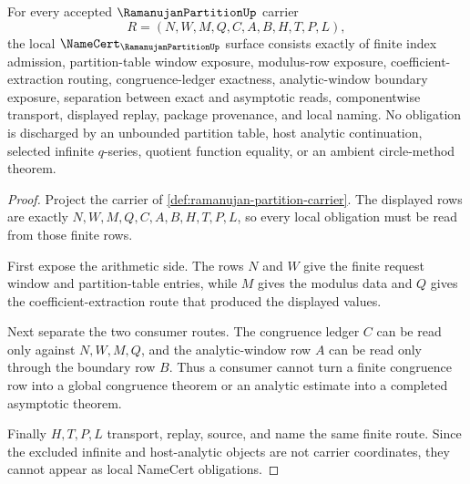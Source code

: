 \begin{theorem}
\label{thm:ramanujan-partition-namecert-obligations}
For every accepted $\RamanujanPartitionUp$ carrier
$$
R=(N,W,M,Q,C,A,B,H,T,P,L),
$$
the local $\NameCert_{\RamanujanPartitionUp}$ surface consists exactly of finite index admission, partition-table window exposure, modulus-row exposure, coefficient-extraction routing, congruence-ledger exactness, analytic-window boundary exposure, separation between exact and asymptotic reads, componentwise transport, displayed replay, package provenance, and local naming. No obligation is discharged by an unbounded partition table, host analytic continuation, selected infinite $q$-series, quotient function equality, or an ambient circle-method theorem.
\end{theorem}
\begin{proof}
Project the carrier of \autoref{def:ramanujan-partition-carrier}. The displayed rows are exactly $N,W,M,Q,C,A,B,H,T,P,L$, so every local obligation must be read from those finite rows.

First expose the arithmetic side. The rows $N$ and $W$ give the finite request window and partition-table entries, while $M$ gives the modulus data and $Q$ gives the coefficient-extraction route that produced the displayed values.

Next separate the two consumer routes. The congruence ledger $C$ can be read only against $N,W,M,Q$, and the analytic-window row $A$ can be read only through the boundary row $B$. Thus a consumer cannot turn a finite congruence row into a global congruence theorem or an analytic estimate into a completed asymptotic theorem.

Finally $H,T,P,L$ transport, replay, source, and name the same finite route. Since the excluded infinite and host-analytic objects are not carrier coordinates, they cannot appear as local NameCert obligations.
\end{proof}

